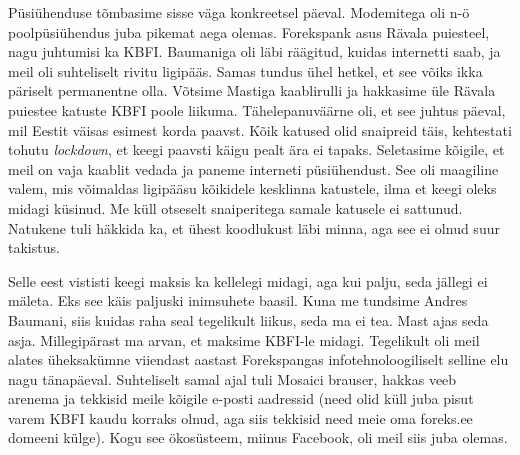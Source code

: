 
Püsiühenduse tõmbasime sisse väga konkreetsel päeval. 
Modemitega oli n-ö poolpüsiühendus juba pikemat aega olemas.  
Forekspank asus Rävala puiesteel, nagu 
juhtumisi ka KBFI. Baumaniga 
oli läbi räägitud, kuidas internetti saab, ja meil oli suhteliselt 
rivitu ligipääs. Samas tundus ühel hetkel, et see võiks ikka päriselt 
permanentne olla. Võtsime Mastiga kaablirulli ja 
hakkasime üle Rävala puiestee katuste KBFI poole liikuma. Tähelepanuväärne oli, 
et see juhtus päeval, mil Eestit väisas esimest korda paavst.
Kõik katused olid snaipreid täis, kehtestati tohutu 
\emph{lockdown}, et keegi paavsti käigu pealt ära ei tapaks.  
Seletasime kõigile, et meil on vaja kaablit vedada ja paneme interneti 
püsiühendust. See oli maagiline valem, mis võimaldas ligipääsu 
kõikidele kesklinna katustele, ilma et keegi oleks midagi küsinud. Me küll 
otseselt snaiperitega samale katusele ei sattunud. Natukene tuli häkkida ka, 
et ühest koodlukust läbi minna, aga see ei olnud suur takistus. 


Selle eest vististi keegi maksis ka kellelegi midagi, aga kui palju, 
seda jällegi ei mäleta. Eks see käis paljuski inimsuhete baasil. 
Kuna me tundsime Andres Baumani, siis kuidas raha
seal tegelikult liikus, seda ma ei tea. Mast ajas seda asja. 
Millegipärast ma arvan, et maksime KBFI-le midagi. 
Tegelikult oli meil alates
üheksakümne viiendast aastast
Forekspangas infotehnoloogiliselt selline elu nagu 
tänapäeval. 
Suhteliselt samal ajal tuli Mosaici brauser, hakkas veeb arenema ja 
tekkisid meile kõigile e-posti aadressid (need olid 
küll juba pisut varem KBFI kaudu korraks olnud, aga siis tekkisid need 
meie oma foreks.ee domeeni külge). Kogu see ökosüsteem, miinus Facebook, oli 
meil siis juba olemas. 


